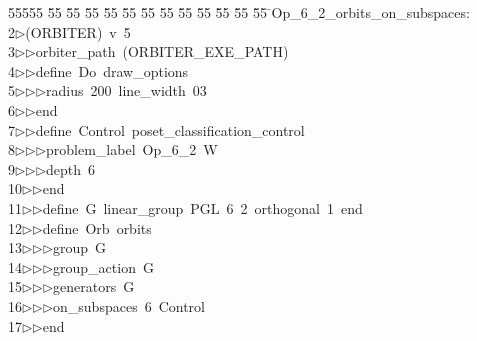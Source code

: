 %
%
\begin{tabbing}
55555 \= 55 \= 55 \= 55 \= 55 \= 55 \= 55 \= 55 \= 55 \= 55 \= 55 \= 55 \= 55 \= \>Op\_6\_2\_orbits\_on\_subspaces:\\[0pt]
2\>$\triangleright$\>(ORBITER)\ v\ 5\ \\[0pt]
3\>$\triangleright$\>$\triangleright$\>orbiter\_path\ (ORBITER\_EXE\_PATH)\ \\[0pt]
4\>$\triangleright$\>$\triangleright$\>define\ Do\ draw\_options\ \\[0pt]
5\>$\triangleright$\>$\triangleright$\>$\triangleright$\>radius\ 200\ line\_width\ 03\ \\[0pt]
6\>$\triangleright$\>$\triangleright$\>end\ \\[0pt]
7\>$\triangleright$\>$\triangleright$\>define\ Control\ poset\_classification\_control\ \\[0pt]
8\>$\triangleright$\>$\triangleright$\>$\triangleright$\>problem\_label\ Op\_6\_2\ W\ \\[0pt]
9\>$\triangleright$\>$\triangleright$\>$\triangleright$\>depth\ 6\ \\[0pt]
10\>$\triangleright$\>$\triangleright$\>end\ \\[0pt]
11\>$\triangleright$\>$\triangleright$\>define\ G\ linear\_group\ PGL\ 6\ 2\ orthogonal\ 1\ end\ \\[0pt]
12\>$\triangleright$\>$\triangleright$\>define\ Orb\ orbits\ \\[0pt]
13\>$\triangleright$\>$\triangleright$\>$\triangleright$\>group\ G\ \\[0pt]
14\>$\triangleright$\>$\triangleright$\>$\triangleright$\>group\_action\ G\ \\[0pt]
15\>$\triangleright$\>$\triangleright$\>$\triangleright$\>generators\ G\ \\[0pt]
16\>$\triangleright$\>$\triangleright$\>$\triangleright$\>on\_subspaces\ 6\ Control\ \\[0pt]
17\>$\triangleright$\>$\triangleright$\>end\ \\[0pt]

\end{tabbing}
